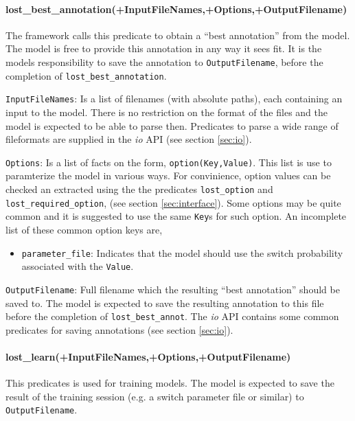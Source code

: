 \documentclass{book}
\begin{document}
\noindent
\paragraph{lost\_best\_annotation(+InputFileNames,+Options,+OutputFilename)}

The framework calls this predicate to obtain a ``best annotation''
from the model. The model is free to provide this annotation in
any way it sees fit. It is the models responsibility to save the
annotation to \texttt{OutputFilename}, before the completion of 
\texttt{lost\_best\_annotation}. 

\texttt{InputFileNames}: Is a list of filenames (with absolute paths),
each containing an input to the model. There is no restriction on the 
format of the files and the model is expected to be able to parse
then. Predicates to parse a wide range of fileformats are supplied 
in the \emph{io} API (see section \ref{sec:io}). 

\texttt{Options}: Is a list of facts on the form,
\texttt{option(Key,Value)}. This list is use to paramterize the model
in various ways. For convinience, option values can be checked an
extracted using the the predicates \texttt{lost\_option} and
\texttt{lost\_required\_option}, (see section \ref{sec:interface}).
Some options may be quite common and it is suggested to use the
same \texttt{Key}s for such option. An incomplete list of these common
option keys are,
\begin{itemize}
\item \texttt{parameter\_file}: Indicates that the model should use
 the switch probability associated with the \texttt{Value}. 
\end{itemize}

\texttt{OutputFilename}: Full filename which the resulting ``best
annotation'' should be saved to. The model is expected to save
the resulting annotation to this file before the completion of 
\texttt{lost\_best\_annot}. The \emph{io} API contains some
common predicates for saving annotations (see section \ref{sec:io}).

\noindent
\paragraph{lost\_learn(+InputFileNames,+Options,+OutputFilename)}

This predicates is used for training models. The model is expected to 
save the result of the training session (e.g. a switch parameter file
or similar) to \texttt{OutputFilename}. 
\end{document}
